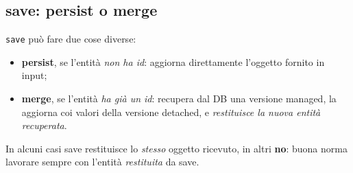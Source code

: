 \subsection{save: persist o merge}
\texttt{save} pu\`o fare due cose diverse:
\begin{itemize}
  \item \textbf{persist}, se l'entit\`a \emph{non ha id}: aggiorna direttamente l'oggetto
        fornito in input;
  \item \textbf{merge}, se l'entit\`a \emph{ha gi\`a un id}: recupera dal DB una versione
        managed, la aggiorna coi valori della versione detached, e \emph{restituisce la nuova
        entit\`a recuperata}.
\end{itemize}
\begin{attenzione}
In alcuni casi save restituisce lo \emph{stesso} oggetto ricevuto, in altri \textbf{no}:
buona norma lavorare sempre con l'entit\`a \emph{restituita} da save.
\end{attenzione}
